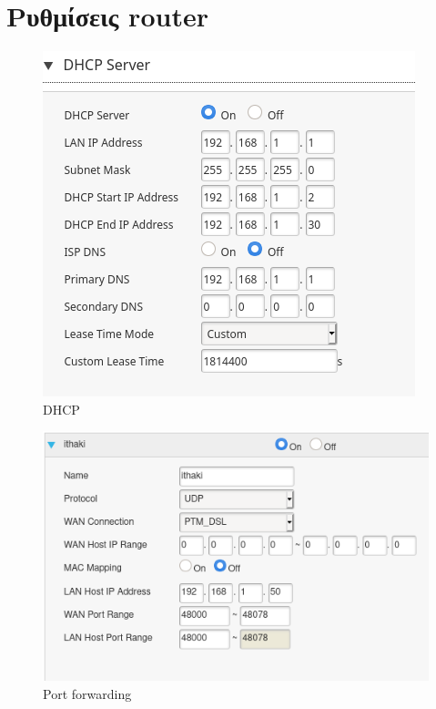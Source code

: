 \documentclass[12pt, a4paper]{article}
\begin{document}



\pagebreak
\tableofcontents



\section{Ρυθμίσεις router}


\begin{figure}[h!]
\centering
	\includegraphics[height=.3\textheight, width=\textwidth, keepaspectratio]{assets/router/dhcp.png}
	\caption{DHCP} 
    \label{fig:dhcp}
\end{figure}




\begin{figure}[h!]
\centering
	\includegraphics[height=.3\textheight, width=\textwidth, keepaspectratio]{assets/router/port_forwarding.png}
	\caption{Port forwarding} 
    \label{fig:portforward}
\end{figure}
\end{document}
